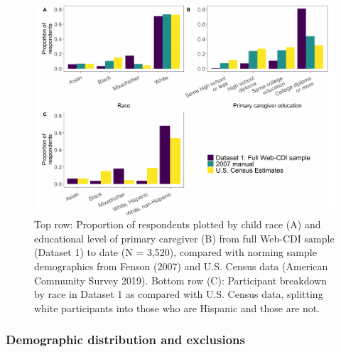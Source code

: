 \documentclass[
  english,
  ,man,floatsintext]{apa6}
\begin{document}
\begin{figure}
\centering
\includegraphics{webcdi_paper_files/figure-latex/demobarfig-1.pdf}
\caption{\label{fig:demobarfig}Top row: Proportion of respondents plotted by child race (A) and educational level of primary caregiver (B) from full Web-CDI sample (Dataset 1) to date (N = 3,520), compared with norming sample demographics from Fenson (2007) and U.S. Census data (American Community Survey 2019).
Bottom row (C): Participant breakdown by race in Dataset 1 as compared with U.S. Census data, splitting white participants into those who are Hispanic and those are not.}
\end{figure}

\hypertarget{demographic-distribution-and-exclusions}{%
\subsubsection{Demographic distribution and exclusions}\label{demographic-distribution-and-exclusions}}
\end{document}
